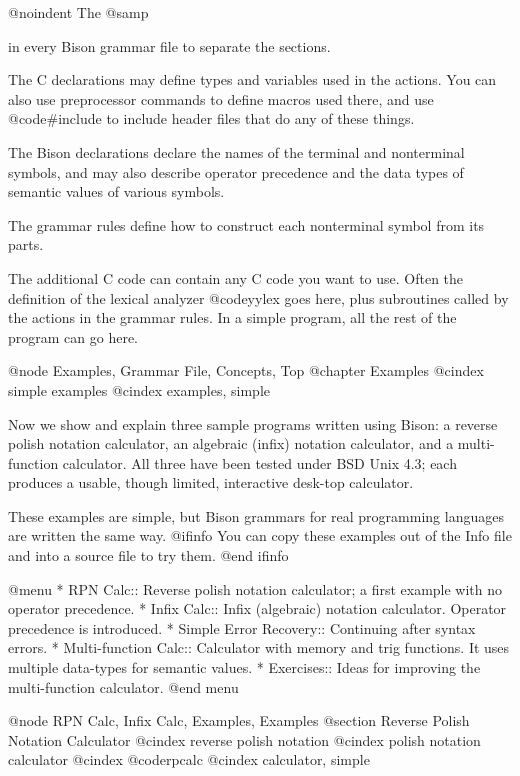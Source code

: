 @noindent
The @samp{%
in every Bison grammar file to separate the sections.

The C declarations may define types and variables used in the actions.
You can also use preprocessor commands to define macros used there, and use
@code{#include} to include header files that do any of these things.

The Bison declarations declare the names of the terminal and nonterminal
symbols, and may also describe operator precedence and the data types of
semantic values of various symbols.

The grammar rules define how to construct each nonterminal symbol from its
parts.

The additional C code can contain any C code you want to use.  Often the
definition of the lexical analyzer @code{yylex} goes here, plus subroutines
called by the actions in the grammar rules.  In a simple program, all the
rest of the program can go here.

@node Examples, Grammar File, Concepts, Top
@chapter Examples
@cindex simple examples
@cindex examples, simple

Now we show and explain three sample programs written using Bison: a
reverse polish notation calculator, an algebraic (infix) notation
calculator, and a multi-function calculator.  All three have been tested
under BSD Unix 4.3; each produces a usable, though limited, interactive
desk-top calculator.

These examples are simple, but Bison grammars for real programming
languages are written the same way.
@ifinfo
You can copy these examples out of the Info file and into a source file
to try them.
@end ifinfo

@menu
* RPN Calc::               Reverse polish notation calculator;
                             a first example with no operator precedence.
* Infix Calc::             Infix (algebraic) notation calculator.
                             Operator precedence is introduced.
* Simple Error Recovery::  Continuing after syntax errors.
* Multi-function Calc::    Calculator with memory and trig functions.
                             It uses multiple data-types for semantic values.
* Exercises::              Ideas for improving the multi-function calculator.
@end menu

@node RPN Calc, Infix Calc, Examples, Examples
@section Reverse Polish Notation Calculator
@cindex reverse polish notation
@cindex polish notation calculator
@cindex @code{rpcalc}
@cindex calculator, simple

}
